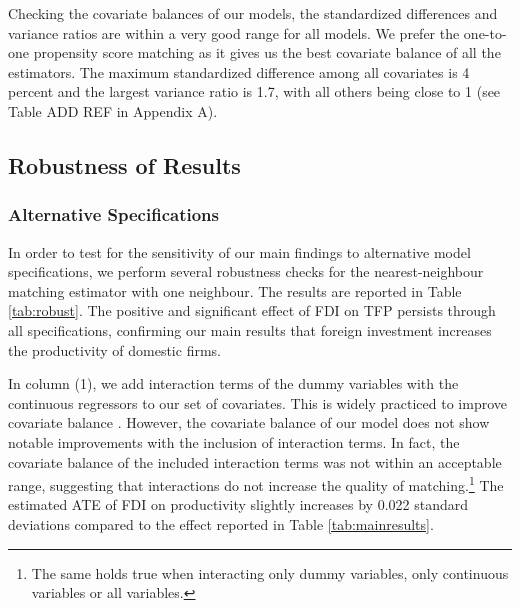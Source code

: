 \documentclass[a4paper,11pt]{scrartcl}
\begin{document}
Checking the covariate balances of our models, the standardized differences and variance ratios are within a very good range for all models. We prefer the one-to-one propensity score matching as it gives us the best covariate balance of all the estimators. The maximum standardized difference among all covariates is 4 percent and the largest variance ratio is 1.7, with all others being close to 1 (see Table ADD REF in Appendix A). 


\subsection{Robustness of Results}

\subsubsection*{Alternative Specifications} 
In order to test for the sensitivity of our main findings to alternative model specifications, we perform several robustness checks for the nearest-neighbour matching estimator with one neighbour. The results are reported in Table \ref{tab:robust}. The positive and significant effect of FDI on TFP persists through all specifications, confirming our main results that foreign investment increases the productivity of domestic firms. 

In column (1), we add interaction terms of the dummy variables with the continuous regressors to our set of covariates. This is widely practiced to improve covariate balance \citep{Caliendo08}.
However, the covariate balance of our model does not show notable improvements with the inclusion of interaction terms. In fact, the covariate balance of the included interaction terms was not within an acceptable range, suggesting that interactions do not increase the quality of matching.\footnote{The same holds true when interacting only dummy variables, only continuous variables or all variables.} The estimated ATE of FDI on productivity slightly increases by 0.022 standard deviations compared to the effect reported in Table \ref{tab:mainresults}. 
\end{document}
